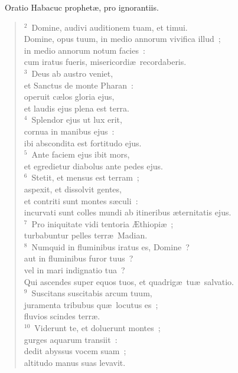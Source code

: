 ~Oratio Habacuc prophet\ae , pro ignorantiis.


\begin{flushleft}\begin{verse}\vspace{6pt}${}^{2}$~Domine, audivi auditionem tuam, et timui.\\ Domine, opus tuum, in medio annorum vivifica illud~;\\ in medio annorum notum facies~:\\ cum iratus fueris, misericordi\ae\ recordaberis.\\
${}^{3}$~Deus ab austro veniet,\\ et Sanctus de monte Pharan~:\\ operuit c\ae los gloria ejus,\\ et laudis ejus plena est terra.\\
${}^{4}$~Splendor ejus ut lux erit,\\ cornua in manibus ejus~:\\ ibi abscondita est fortitudo ejus.\\
${}^{5}$~Ante faciem ejus ibit mors,\\ et egredietur diabolus ante pedes ejus.\\
${}^{6}$~Stetit, et mensus est terram~;\\ aspexit, et dissolvit gentes,\\ et contriti sunt montes s\ae culi~:\\ incurvati sunt colles mundi ab itineribus \ae ternitatis ejus.\\
${}^{7}$~Pro iniquitate vidi tentoria \AE thiopi\ae~;\\ turbabuntur pelles terr\ae\ Madian.\\
${}^{8}$~Numquid in fluminibus iratus es, Domine~?\\ aut in fluminibus furor tuus~?\\ vel in mari indignatio tua~?\\ Qui ascendes super equos tuos, et quadrig\ae\ tu\ae\ salvatio.\\
${}^{9}$~Suscitans suscitabis arcum tuum,\\ juramenta tribubus qu\ae\ locutus es~;\\ fluvios scindes terr\ae .\\
${}^{10}$~Viderunt te, et doluerunt montes~;\\ gurges aquarum transiit~:\\ dedit abyssus vocem suam~;\\ altitudo manus suas levavit.\\

\end{verse}
\end{flushleft}
